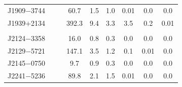 \documentclass[useAMS,usenatbib]{mn2e}
\begin{document}
\begin{table}
\begin{center}
\begin{tabular}{lcccccccc}
J1909$-$3744&         &                   & 60.7     & 1.5       & 1.0         &  0.01    &  0.0              &  0.0      \\ 
J1939$+$2134&         &                   & 392.3    & 9.4       & 3.3         &  3.5     &  0.2              &  0.01     \\ 
            &         &                   &          &           &             &          &                   &           \\
J2124$-$3358&         &                   & 16.0     & 0.8       & 0.3         &  0.0     &  0.0              &  0.0   \\ 
J2129$-$5721&         &                   & 147.1    & 3.5       & 1.2         &  0.1     &  0.01             &  0.0   \\ 
J2145$-$0750&         &                   & 9.7      & 0.9       & 0.3         &  0.0     &  0.0              &  0.0   \\ 
J2241$-$5236&         &                   & 89.8     & 2.1       & 1.5         &  0.01    &  0.0              &  0.0  \\ 
%
\hline
\end{tabular}
\end{center}
\end{table}
	
\end{document}

